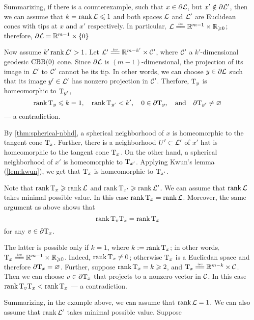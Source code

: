 Summarizing, if there is a counterexample, such that $x\in \partial \mathcal{L}$, but $x'\notin \partial \mathcal{L}'$,
then we can assume that $k=\operatorname{\rm rank}\nolimits \mathcal{L}\leqslant 1$ and both spaces $\mathcal{L}$ and $\mathcal{L}'$ are Euclidean cones with tips at $x$ and $x'$ respectively.
In particular, $\spc{L}\iso \RR^{m-1}\times \RR_{\ge0}$;
therefore, 
$\partial\mathcal{L}= \mathbb{R}^{m-1}\times \{0\}$

Now assume $k'\operatorname{\rm rank}\nolimits \mathcal{L}'> 1$.
Let $\spc{L}'\iso \RR^{m-k'}\times \spc{C}'$, where $\mathcal{C}'$ a $k'$-dimensional geodesic $\mathrm{CBB}(0)$ cone.
Since $\partial\mathcal{L}$ is $(m-1)$-dimensional,
the projection of its image in $\mathcal{L}'$ to $\mathcal{C}'$
cannot be its tip.
In other words, we can choose $y\in \partial \mathcal{L}$ such that its image $y'\in \mathcal{L}'$ has nonzero projection in $\mathcal{C}'$.
Therfore, $\mathrm{T}_y$ is homeomorphic to $\mathrm{T}_{y'}$, 
\[\operatorname{\rm rank}\nolimits\mathrm{T}_y\leqslant k=1,
\quad
\operatorname{\rm rank}\nolimits\mathrm{T}_{y'}< k',
\quad
0\in \partial \mathrm{T}_y,
\quad\text{and}\quad
\partial \mathrm{T}_{y'}\ne \varnothing\]
--- a contradiction.
\qeds




By \ref{thm:spherical-nbhd}, a spherical neighborhood of $x$ is homeomorphic to the tangent cone $\mathrm{T}_x$.
Further, there is a neighborhood $U'\subset \mathcal{L}'$ of $x'$ hat is homeomorphic to the tangent cone $\mathrm{T}_x$.
On the other hand, a spherical neighborhood of $x'$ is homeomorphic to $\mathrm{T}_{x'}$.
Applying Kwun's lemma (\ref{lem:kwun}), we get that $\mathrm{T}_x$ is homeomorphic to $\mathrm{T}_{x'}$.


Note that $\operatorname{\rm rank}\nolimits \mathrm{T}_x\geqslant \operatorname{\rm rank}\nolimits \mathcal{L}$ and $\operatorname{\rm rank}\nolimits \mathrm{T}_{x'}\geqslant \operatorname{\rm rank}\nolimits \mathcal{L}'$.
We can assume that $\operatorname{\rm rank}\nolimits \mathcal{L}$ takes minimal possible value.
In this case $\operatorname{\rm rank}\nolimits \mathrm{T}_x= \operatorname{\rm rank}\nolimits \mathcal{L}$.
Moreover, the same argument as above shows that 
\[\operatorname{\rm rank}\nolimits \mathrm{T}_v\mathrm{T}_x=\operatorname{\rm rank}\nolimits \mathrm{T}_x\]
for any $v\in \partial\mathrm{T}_x$.

The latter is possible only if $k=1$, where $k\mathrel{:=} \operatorname{\rm rank}\nolimits \mathrm{T}_x$;
in other words, $\T_x\iso \RR^{m-1}\times \RR_{\ge0}$.
Indeed, $\operatorname{\rm rank}\nolimits \mathrm{T}_x\ne 0$;
otherwise $\mathrm{T}_x$ is a Eucliedan space and therefore $\partial \mathrm{T}_x=\varnothing$.
Further, suppose $\operatorname{\rm rank}\nolimits \mathrm{T}_x=k\geqslant 2$, and $\T_x\iso \RR^{m-k}\times \spc{C}$.
Then we can choose $v\in \partial \mathrm{T}_x$ that projects to a nonzero vector in $\mathcal{C}$.
In this case $\operatorname{\rm rank}\nolimits \mathrm{T}_v\mathrm{T}_x<\operatorname{\rm rank}\nolimits \mathrm{T}_x$ --- a contradiction.

Summarizing, in the example above, we can assume that $\operatorname{\rm rank}\nolimits \mathcal{L}=1$.
We can also assume that $\operatorname{\rm rank}\nolimits \mathcal{L}'$ takes minimal possible value.
Suppose 







